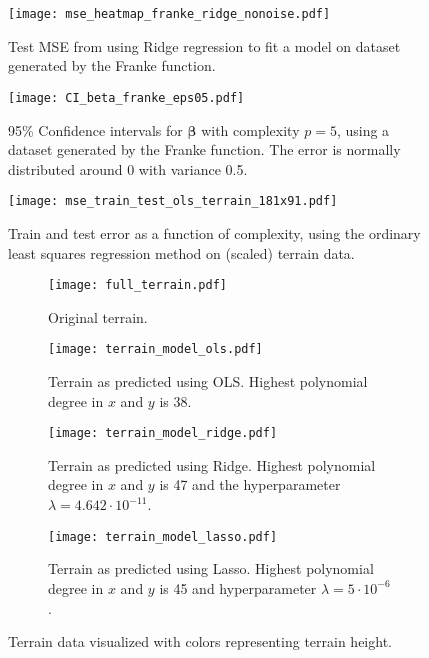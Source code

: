 \documentclass[%
 reprint,
nofootinbib,
 amsmath,amssymb,
 aps,
]{revtex4-2}
\begin{document}
\begin{figure*}[t]
\texttt{[image: mse\_heatmap\_franke\_ridge\_nonoise.pdf]}
\caption{\label{fig:mse_heatmap_franke_ridge_nonoise} Test MSE from using Ridge regression to fit a model on dataset generated by the Franke function.}
\end{figure*}

\begin{figure}[b]
\texttt{[image: CI\_beta\_franke\_eps05.pdf]}
\caption{\label{fig:CI_beta_franke_eps05} 95\% Confidence intervals for $\boldsymbol{\beta}$ with complexity $p=5$, using a dataset generated by the Franke function. The error is normally distributed around 0 with variance 0.5.}
\end{figure}

\begin{figure}[b]
\texttt{[image: mse\_train\_test\_ols\_terrain\_181x91.pdf]}
\caption{\label{fig:mse_train_test_ols_terrain_181x91} Train and test error as a function of complexity, using the ordinary least squares regression method on (scaled) terrain data.}
\end{figure}

\begin{figure*}[t]
\centering
\begin{subfigure}{.5\textwidth}
    \centering
    \texttt{[image: full\_terrain.pdf]}    \caption[short]{Original terrain.}
\end{subfigure}%
\begin{subfigure}{.5\textwidth}
    \centering
    \texttt{[image: terrain\_model\_ols.pdf]}
    \caption[short]{Terrain as predicted using OLS. Highest polynomial degree in $x$ and $y$ is 38.}
\end{subfigure}
\begin{subfigure}{.5\textwidth}
    \centering
    \texttt{[image: terrain\_model\_ridge.pdf]}
    \caption[short]{Terrain as predicted using Ridge. Highest polynomial degree in $x$ and $y$ is 47 and the hyperparameter $\lambda = 4.642\cdot 10^{-11}$.}
\end{subfigure}%
\begin{subfigure}{.5\textwidth}
    \centering
    \texttt{[image: terrain\_model\_lasso.pdf]}
    \caption[short]{Terrain as predicted using Lasso. Highest polynomial degree in $x$ and $y$ is 45 and hyperparameter $\lambda = 5\cdot 10^{-6}$.}
\end{subfigure}
\centering\caption[short]{\label{fig:terrain} Terrain data visualized with colors representing terrain height.}
\end{figure*}
\end{document}
